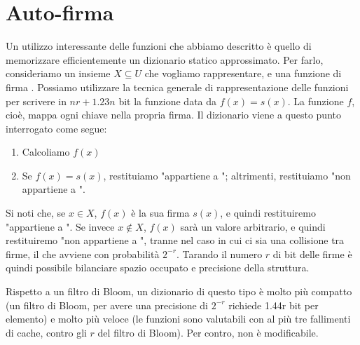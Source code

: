 \section{Auto-firma}
Un utilizzo interessante delle funzioni che abbiamo descritto è quello di memorizzare efficientemente un dizionario statico approssimato. Per farlo, consideriamo un insieme $X \subseteq U$ che vogliamo rappresentare, e una funzione di firma .
Possiamo utilizzare la tecnica generale di rappresentazione delle funzioni per scrivere in $nr + 1.23n$ bit la funzione  data da $f(x) = s(x)$. La funzione $f$, cioè, mappa ogni chiave nella propria firma. Il dizionario viene a questo punto interrogato come segue:
\begin{enumerate}
	\item Calcoliamo $f(x)$
	\item Se $f(x) = s(x)$, restituiamo "appartiene a "; altrimenti, restituiamo "non appartiene a ".
\end{enumerate}
Si noti che, se $x \in X$, $f(x)$ è la sua firma $s(x)$, e quindi restituiremo "appartiene a ". Se invece $x \notin X$, $f(x)$ sarà un valore arbitrario, e quindi restituiremo "non appartiene a ", tranne nel caso in cui ci sia una collisione tra firme, il che avviene con probabilità $2^{-r}$. Tarando il numero $r$ di bit delle firme è quindi possibile bilanciare spazio occupato e precisione della struttura.

Rispetto a un filtro di Bloom, un dizionario di questo tipo è molto più compatto (un filtro di Bloom, per avere una precisione di $2^{-r}$ richiede 1.44r bit per elemento) e molto più veloce (le funzioni sono valutabili con al più tre fallimenti di cache, contro gli $r$ del filtro di Bloom). Per contro, non è modificabile.
